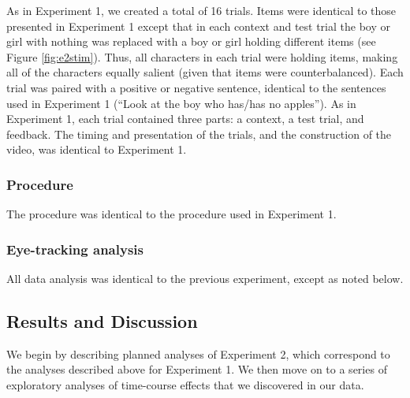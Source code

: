 \documentclass[man]{apa2}
\begin{document}
As in Experiment 1, we created a total of 16 trials.  Items were identical to those presented in Experiment 1 except that in each context and test trial the boy or girl with nothing was replaced with a boy or girl holding different items (see Figure \ref{fig:e2stim}).  Thus, all characters in each trial were holding items, making all of the characters equally salient (given that items were counterbalanced).  Each trial was paired with a positive or negative sentence, identical to the sentences used in Experiment 1 (``Look at the boy who has/has no apples'').  As in Experiment 1, each trial contained three parts: a context, a test trial, and feedback.  The timing and presentation of the trials, and the construction of the video, was identical to Experiment 1.  

\subsubsection{Procedure}

The procedure was identical to the procedure used in Experiment 1.  

\subsubsection{Eye-tracking analysis}

All data analysis was identical to the previous experiment, except as noted below.


\subsection{Results and Discussion}

We begin by describing planned analyses of Experiment 2, which correspond to the analyses described above for Experiment 1. We then move on to a series of exploratory analyses of time-course effects that we discovered in our data.
\end{document}
